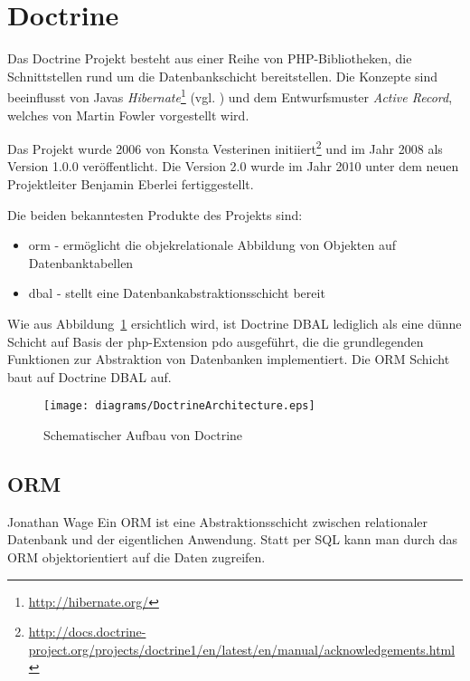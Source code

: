 \section{Doctrine}
Das Doctrine Projekt besteht aus einer Reihe von PHP-Bibliotheken, die Schnittstellen rund um die Datenbankschicht bereitstellen. Die Konzepte sind beeinflusst von Javas \textit{Hibernate}\footnote{\url{http://hibernate.org/}} (vgl. \cite{web:t3nDoctrine2009}) und dem Entwurfsmuster \textit{Active Record}, welches von Martin Fowler \cite{book:fowlerPatterns2003} vorgestellt wird.

Das Projekt wurde 2006 von Konsta Vesterinen initiiert\footnote{\url{http://docs.doctrine-project.org/projects/doctrine1/en/latest/en/manual/acknowledgements.html}} und im Jahr 2008 als Version 1.0.0 veröffentlicht. Die Version 2.0 wurde im Jahr 2010 unter dem neuen Projektleiter Benjamin Eberlei fertiggestellt.

Die beiden bekanntesten Produkte des Projekts sind:
\begin{itemize}
	\item \gls{orm} - ermöglicht die objekrelationale Abbildung von Objekten auf Datenbanktabellen
	\item \gls{dbal} - stellt eine Datenbankabstraktionsschicht bereit
\end{itemize}

Wie aus Abbildung~\ref{fig:doctrineArchitecture} ersichtlich wird, ist Doctrine DBAL lediglich als eine dünne Schicht auf Basis der \gls{php}-Extension \gls{pdo} ausgeführt, die die grundlegenden Funktionen zur Abstraktion von Datenbanken implementiert. Die ORM Schicht baut auf Doctrine DBAL auf.

\begin{figure}[H]
    \centering
    \texttt{[image: diagrams/DoctrineArchitecture.eps]}
    \caption{Schematischer Aufbau von Doctrine}
    \label{fig:doctrineArchitecture}
\end{figure}

\subsection{ORM}
\begin{shadequote}[l]{Jonathan Wage \cite{web:t3nDoctrine2009}}
	Ein ORM ist eine Abstraktionsschicht zwischen relationaler Datenbank und der eigentlichen Anwendung. Statt per SQL kann man durch das ORM objektorientiert auf die Daten zugreifen.
\end{shadequote}

